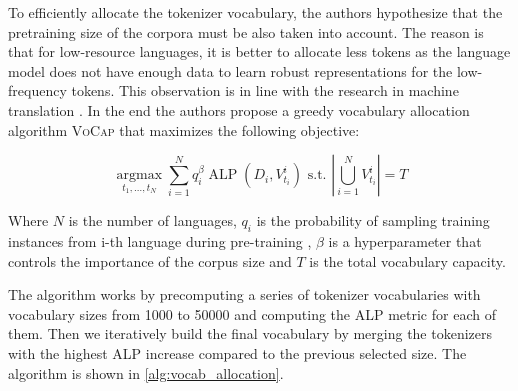 

To efficiently allocate the tokenizer vocabulary, the authors hypothesize that the pretraining size of the corpora must be also taken into account. The reason is that for low-resource languages, it is better to allocate less tokens as the language model does not have enough data to learn robust representations for the low-frequency tokens. This observation is in line with the research in machine translation \cite{gowda_finding_2020}. In the end the authors propose a greedy vocabulary allocation algorithm \textsc{VoCap} that maximizes the following objective:

$$
\underset{t_1, \ldots, t_N}{\operatorname{argmax}} \sum_{i=1}^N q_i^\beta \operatorname{ALP}\left(D_i, V_{t_i}^i\right) \text { s.t. }\left|\bigcup_{i=1}^N V_{t_i}^i\right|=T
$$

Where $N$ is the number of languages, $q_i$ is the probability of sampling training instances from i-th language during pre-training , $\beta$ is a hyperparameter that controls the importance of the corpus size and $T$ is the total vocabulary capacity. 

The algorithm works by precomputing a series of tokenizer vocabularies with vocabulary sizes from 1000 to 50000 and computing the ALP metric for each of them. Then we iteratively build the final vocabulary by merging the tokenizers with the highest ALP increase compared to the previous selected size. The algorithm is shown in \autoref{alg:vocab_allocation}.


